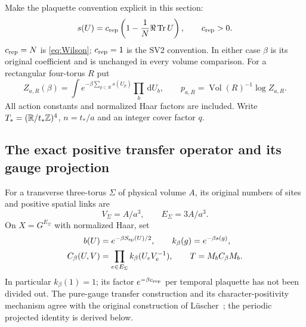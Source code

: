 \documentclass[11pt,letterpaper]{article}
\theoremstyle{plain}
\theoremstyle{remark}\newtheorem{remark}[theorem]{Scope}
\DeclareMathOperator{\Tr}{Tr}\DeclareMathOperator{\Vol}{Vol}
\newcommand{\dd}{\,\mathrm d}\newcommand{\OH}{\mathcal O_H}
\begin{document}
Make the plaquette convention explicit in this section:
\begin{equation}
s(U)=c_{\rm rep}\left(1-\frac1N\Re\Tr U\right),\qquad c_{\rm rep}>0.
\label{eq:actionconvention}
\end{equation}
$c_{\rm rep}=N$ is \eqref{eq:Wilson}; $c_{\rm rep}=1$ is the SV2 convention.
In either case $\beta$ is its original coefficient and is unchanged in every
volume comparison. For a rectangular four-torus $R$ put
\begin{equation}
Z_{a,R}(\beta)=\int e^{-\beta\sum_{p\subset R}s(U_p)}\prod_b\dd U_b,
\qquad p_{a,R}=\Vol(R)^{-1}\log Z_{a,R}.
\label{eq:pressuredef}
\end{equation}
All action constants and normalized Haar factors are included. Write
$T_*=(\mathbb R/t_*\mathbb Z)^4$, $n=t_*/a$ and an integer cover factor $q$.

\subsection{The exact positive transfer operator and its gauge projection}

For a transverse three-torus $\Sigma$ of physical volume $A$, its original
numbers of sites and positive spatial links are
\begin{equation}
V_\Sigma=A/a^3,\qquad E_\Sigma=3A/a^3.
\label{eq:slicecount}
\end{equation}
On $X=G^{E_\Sigma}$ with normalized Haar, set
\begin{align}
b(U)&=e^{-\beta S_{\rm sp}(U)/2},\qquad k_\beta(g)=e^{-\beta s(g)},\notag\\
C_\beta(U,V)&=\prod_{e\in E_\Sigma}k_\beta(U_eV_e^{-1}),\qquad
T=M_bC_\beta M_b.
\label{eq:transfer}
\end{align}
In particular $k_\beta(1)=1$; its factor $e^{-\beta c_{\rm rep}}$ per temporal
plaquette has not been divided out. The pure-gauge transfer construction and
its character-positivity mechanism agree with the original construction of
L\"uscher~\cite{luscher}; the periodic projected identity is derived below.
\end{document}
